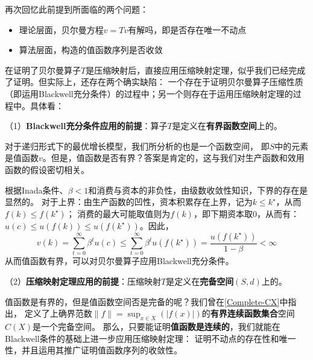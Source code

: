 再次回忆此前提到所面临的两个问题：
\begin{itemize}
    \item 理论层面，贝尔曼方程$v=Tv$有解吗，即是否存在唯一不动点
    \item 算法层面，构造的值函数序列是否收敛
\end{itemize}

在证明了贝尔曼算子$T$是压缩映射后，直接应用压缩映射定理，似乎我们已经完成了证明。但实际上，还存在两个确实缺陷：
一个存在于证明贝尔曼算子压缩性质（即运用Blackwell充分条件）的过程中；另一个则存在于运用压缩映射定理的过程中。具体看：

（1）\textbf{Blackwell充分条件应用的前提}：算子$T$是定义在\textbf{有界函数空间}上的。

对于递归形式下的最优增长模型，我们所分析的也是一个函数空间，
即$S$中的元素是值函数$v$。但是，值函数是否有界？答案是肯定的，这与我们对生产函数和效用函数的假设密切相关。

根据Inada条件、$\beta < 1$和消费与资本的非负性，由级数收敛性知识，下界的存在是显然的。
对于上界：由生产函数的凹性，资本积累存在上界，记为$k \leq k^{\star}$，从而$f\left(k\right) \leq f\left(k^{\star}\right)$；
消费的最大可能取值则为$f\left(k\right)$，即下期资本取0，从而有：
$u\left(c\right)\leq u\left(f\left(k\right)\right)\leq u\left(f\left(k^{\star}\right)\right)$。因此，
$$
v\left(k\right) = \sum_{t=0}^{\infty} \beta^t u\left(c\right) \leq 
    \sum_{t=0}^{\infty} \beta^t u\left(f\left(k^{\star}\right)\right)
    = \frac{u\left(f\left(k^{\star}\right)\right)}{1-\beta} < \infty
$$
从而值函数有界，可以对贝尔曼算子应用Blackwell充分条件。

（2）\textbf{压缩映射定理应用的前提}：压缩映射$T$是定义在\textbf{完备空间}$\left(S,d\right)$上的。

值函数是有界的，但是值函数空间否是完备的呢？我们曾在\cref{Complete-CX}中指出，
定义了上确界范数$\|f\|=\sup _{x \in X}(|f(x)|)$的\textbf{有界连续函数集合}空间$C\left(X\right)$是一个完备空间。
那么，只要能证明\textbf{值函数是连续的}，我们就能在Blackwell条件的基础上进一步应用压缩映射定理：
证明不动点的存在性和唯一性，并且运用其推广证明值函数序列的收敛性。